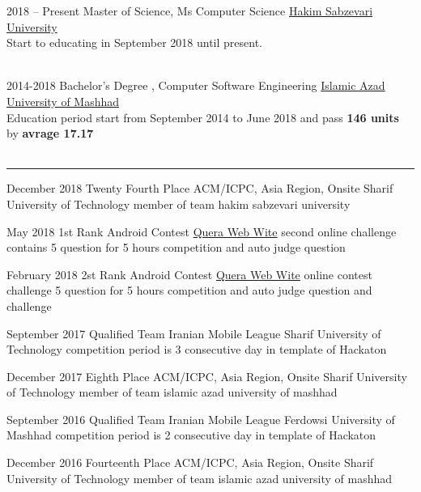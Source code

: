 \documentclass[8pt]{developercv} %
\begin{document}
\begin{entrylist}
	\entry
	{2018 -- Present}
	{Master of Science, Ms Computer Science}
	{\href{http://www.hsu.ac.ir/en/}{Hakim Sabzevari University\\}}
	{Start to educating in September 2018 until present.\\\\}

	\entry
	{2014-2018}
	{Bachelor's Degree , Computer Software Engineering}
	{\href{http://mshdiau.ac.ir/}{Islamic Azad University of Mashhad\\}}
	{Education period start from September 2014 to June 2018 and pass \textbf{146 units} by \textbf{avrage 17.17}\\\\}
\end{entrylist}


\vspace{35pt} %
\noindent\rule{\textwidth}{1pt}

\vspace{5pt} %

\begin{entrylist}

	\entry
	{December 2018}
	{Twenty Fourth Place ACM/ICPC, Asia Region, Onsite }
	{Sharif University of Technology}
	{member of team hakim sabzevari university}

	\entry
	{May 2018}
	{1st Rank Android Contest}
	{\href{https://quera.ir/course/assignments/5256/scoreboard/}{Quera Web Wite}}
	{second online challenge contains 5 question for 5 hours competition and auto judge question }

	\entry
	{February 2018}
	{2st Rank Android Contest}
	{\href{https://quera.ir/course/assignments/4442/scoreboard/}{Quera Web Wite}}
	{online contest challenge 5 question for 5 hours competition and auto judge question and challenge}



	\entry
	{September 2017}
	{Qualified Team Iranian Mobile League}
	{Sharif University of Technology}
	{competition period is 3 consecutive day in template of Hackaton}


	\entry
	{December 2017}
	{Eighth Place ACM/ICPC, Asia Region, Onsite }
	{Sharif University of Technology}
	{member of team islamic azad university of mashhad}



	\entry
	{September 2016}
	{Qualified Team Iranian Mobile League}
	{Ferdowsi University of Mashhad}
	{competition period is 2 consecutive day in template of Hackaton}

	\entry
	{December 2016}
	{Fourteenth Place ACM/ICPC, Asia Region, Onsite }
	{Sharif University of Technology}
	{member of team islamic azad university of mashhad}




\end{entrylist}
\end{document}
